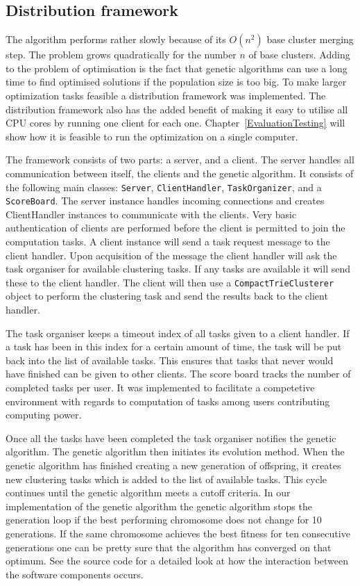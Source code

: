 \subsection{Distribution framework}
The \CTC algorithm performs rather slowly because of its \(O(n^2)\) base cluster merging step. The problem grows quadratically for the number \(n\) of base clusters. Adding to the problem of optimisation is the fact that genetic algorithms can use a long time to find optimised solutions if the population size is too big. To make larger optimization tasks feasible a distribution framework was implemented. The distribution framework also has the added benefit of making it easy to utilise all CPU cores by running one client for each one. Chapter~\ref{EvaluationTesting} will show how it is feasible to run the optimization on a single computer.

The framework consists of two parts: a server, and a client. The server handles all communication between itself, the clients and the genetic algorithm. It consists of the following main classes: \texttt{Server}, \texttt{ClientHandler}, \texttt{TaskOrganizer}, and a \texttt{ScoreBoard}. The server instance handles incoming connections and creates ClientHandler instances to communicate with the clients. Very basic authentication of clients are performed before the client is permitted to join the computation tasks. A client instance will send a task request message to the client handler. Upon acquisition of the message the client handler will ask the task organiser for available clustering tasks. If any tasks are available it will send these to the client handler. The client will then use a \texttt{CompactTrieClusterer} object to perform the clustering task and send the results back to the client handler.

The task organiser keeps a timeout index of all tasks given to a client handler. If a task has been in this index for a certain amount of time, the task will be put back into the list of available tasks. This ensures that tasks that never would have finished can be given to other clients. The score board tracks the number of completed tasks per user. It was implemented to facilitate a competetive environment with regards to computation of tasks among users contributing computing power.

Once all the tasks have been completed the task organiser notifies the genetic algorithm. The genetic algorithm then initiates its evolution method. When the genetic algorithm has finished creating a new generation of offspring, it creates new clustering tasks which is added to the list of available tasks. This cycle continues until the genetic algorithm meets a cutoff criteria. In our implementation of the genetic algorithm the genetic algorithm stops the generation loop if the best performing chromosome does not change for 10 generations. If the same chromosome achieves the best fitness for ten consecutive generations one can be pretty sure that the algorithm has converged on that optimum. See the source code for a detailed look at how the interaction between the software components occurs.